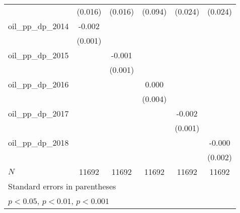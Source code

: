 {\begin{tabular}{l*{5}{c}}
            &     (0.016)         &     (0.016)         &     (0.094)         &     (0.024)         &     (0.024)         \\
[1em]
oil\_pp\_dp\_2014&      -0.002\sym{*}  &                     &                     &                     &                     \\
            &     (0.001)         &                     &                     &                     &                     \\
[1em]
oil\_pp\_dp\_2015&                     &      -0.001         &                     &                     &                     \\
            &                     &     (0.001)         &                     &                     &                     \\
[1em]
oil\_pp\_dp\_2016&                     &                     &       0.000         &                     &                     \\
            &                     &                     &     (0.004)         &                     &                     \\
[1em]
oil\_pp\_dp\_2017&                     &                     &                     &      -0.002\sym{**} &                     \\
            &                     &                     &                     &     (0.001)         &                     \\
[1em]
oil\_pp\_dp\_2018&                     &                     &                     &                     &      -0.000         \\
            &                     &                     &                     &                     &     (0.002)         \\
\hline
\(N\)       &       11692         &       11692         &       11692         &       11692         &       11692         \\
\hline\hline
\multicolumn{6}{l}{\footnotesize Standard errors in parentheses}\\
\multicolumn{6}{l}{\footnotesize \sym{*} \(p<0.05\), \sym{**} \(p<0.01\), \sym{***} \(p<0.001\)}\\
\end{tabular}
}
